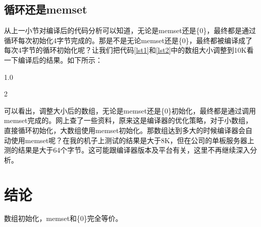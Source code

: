 \documentclass[a4paper, 12pt, titlepage]{article}
\newenvironment{parcolumenv}[1] {\begin{spacing}{#1}}{\end{spacing}}
\begin{document}
\subsection{循环还是memset}
从上一小节对编译后的代码分析可以知道，无论是memset还是\{0\}，最终都是通过循环每次初始化4字节完成的。那是不是无论memset还是\{0\}，最终都被编译成了每次4字节的循环初始化呢？让我们把代码\ref{lst1}和\ref{lst2}中的数组大小调整到10K看一下编译后的结果。如下所示：
\begin{parcolumenv}{1.0}
\begin{parcolumns}{2}

\end{parcolumns}
\end{parcolumenv}
可以看出，调整大小后的数组，无论是memset还是\{0\}初始化，最终都是通过调用memset完成的。网上查了一些资料，原来这是编译器的优化策略，对于小数组，直接循环初始化，大数组使用memset初始化。那数组达到多大的时候编译器会自动使用memset呢？在我的机子上测试的结果是大于8K，但在公司的单板服务器上测的结果是大于64个字节。这可能跟编译器版本及平台有关，这里不再继续深入分析。

\section{结论}
数组初始化，memset和\{0\}完全等价。
\end{document}
